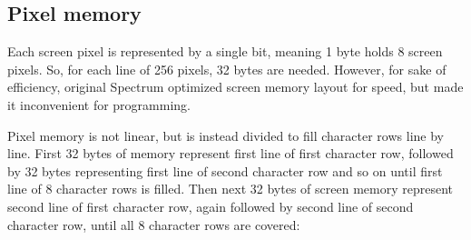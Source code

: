 \documentclass[12pt,twoside,openright,a4paper]{book}
\begin{document}
\subsection{Pixel memory}

Each screen pixel is represented by a single bit, meaning 1 byte holds 8 screen pixels. So, for each line of 256 pixels, 32 bytes are needed. However, for sake of efficiency, original Spectrum optimized screen memory layout for speed, but made it inconvenient for programming.

Pixel memory is not linear, but is instead divided to fill character rows line by line. First 32 bytes of memory represent first line of first character row, followed by 32 bytes representing first line of second character row and so on until first line of 8 character rows is filled. Then next 32 bytes of screen memory represent second line of first character row, again followed by second line of second character row, until all 8 character rows are covered:
\end{document}
